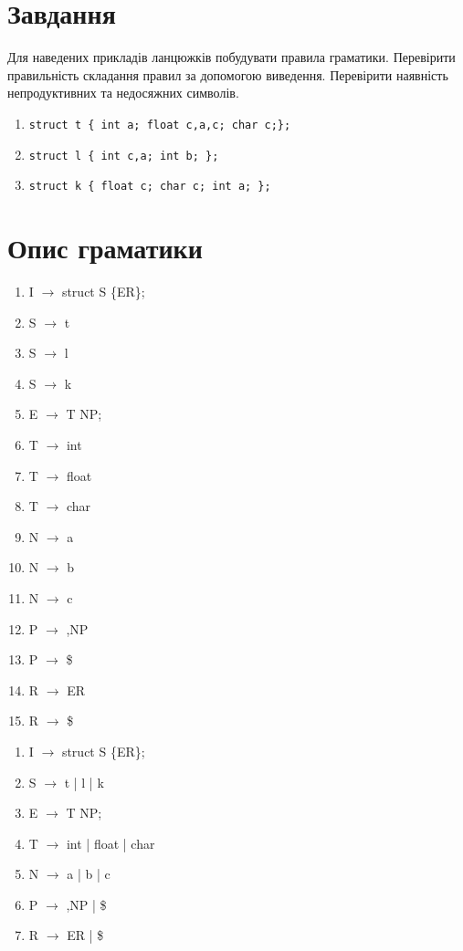 \section{Завдання}
Для наведених прикладів ланцюжків побудувати правила граматики.
Перевірити правильність складання правил за допомогою виведення.
Перевірити наявність непродуктивних та недосяжних символів.
\begin{enumerate}
    \item \verb|struct t { int a; float c,a,c; char c;};|
    \item \verb|struct l { int c,a; int b; };|
    \item \verb|struct k { float c; char c; int a; };|
\end{enumerate}


\section{Опис граматики}
\begin{multicols}{2}
\begin{enumerate}
    \item  I $\to$ struct S \{ER\};
    \item  S $\to$ t
    \item  S $\to$ l
    \item  S $\to$ k
    \item  E $\to$ T NP;
    \item  T $\to$ int
    \item  T $\to$ float
    \item  T $\to$ char
    \item  N $\to$ a
    \item  N $\to$ b
    \item  N $\to$ c
    \item  P $\to$ ,NP
    \item  P $\to$ \$
    \item  R $\to$ ER
    \item  R $\to$ \$
\end{enumerate}
\columnbreak
\begin{enumerate}
    \item  I $\to$ struct S \{ER\};
    \item  S $\to$ t | l | k
    \item  E $\to$ T NP;
    \item  T $\to$ int | float | char
    \item  N $\to$ a | b | c
    \item  P $\to$ ,NP | \$
    \item  R $\to$ ER | \$
\end{enumerate}
\end{multicols}


